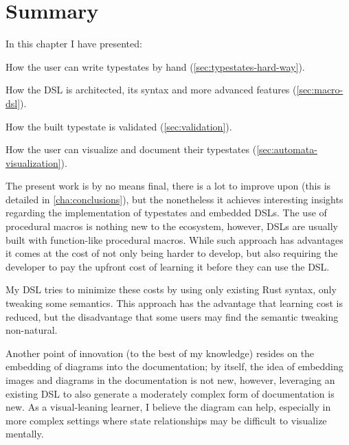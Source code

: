 
\section{Summary}

In this chapter I have presented:
\begin{compactitem}
    \item How the user can write typestates by hand (\autoref{sec:typestates-hard-way}).
    \item How the DSL is architected, its syntax and more advanced features (\autoref{sec:macro-dsl}).
    \item How the built typestate is validated (\autoref{sec:validation}).
    \item How the user can visualize and document their typestates (\autoref{sec:automata-visualization}).
\end{compactitem}

The present work is by no means final, there is a lot to improve upon (this is detailed in \autoref{cha:conclusions}),
but the nonetheless it achieves interesting insights regarding the implementation of typestates and embedded DSLs.
The use of procedural macros is nothing new to the ecosystem, however, DSLs are usually built with function-like procedural macros.
While such approach has advantages  it comes at the cost of not only being harder to develop,
but also requiring the developer to pay the upfront cost of learning it before they can use the DSL.

My DSL tries to minimize these costs by using only existing Rust syntax, only tweaking some semantics.
This approach has the advantage that learning cost is reduced,
but the disadvantage that some users may find the semantic tweaking non-natural.

Another point of innovation (to the best of my knowledge) resides on the embedding of diagrams into the documentation;
by itself, the idea of embedding images and diagrams in the documentation is not new,
however, leveraging an existing DSL to also generate a moderately complex form of documentation is new.
As a visual-leaning learner, I believe the diagram can help,
especially in more complex settings where state relationships may be difficult to visualize mentally.

